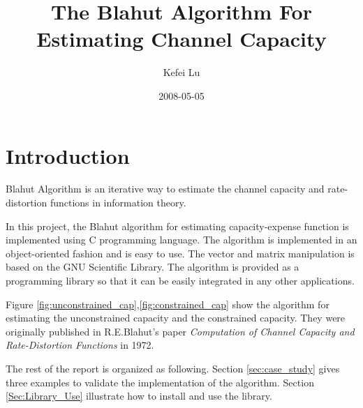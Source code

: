 \documentclass[a4paper,10pt]{article}
\author{Kefei Lu}
\title{The Blahut Algorithm For Estimating Channel Capacity}
\date{2008-05-05}
\begin{document}
\maketitle


\section{Introduction}
Blahut Algorithm is an iterative way to estimate the channel capacity and rate-distortion functions in information theory. 

In this project, the Blahut algorithm for estimating capacity-expense function is implemented using C programming language. The algorithm is implemented in an object-oriented fashion and is easy to use. The vector and matrix manipulation is based on the GNU Scientific Library. The algorithm is provided as a programming library so that it can be easily integrated in any other applications.

Figure \ref{fig:unconstrained_cap},\ref{fig:constrained_cap} show the algorithm for estimating the unconstrained capacity and the constrained capacity. They were originally published in R.E.Blahut's paper \textit{Computation of Channel Capacity and Rate-Distortion Functions} in 1972. 

The rest of the report is organized as following. Section \ref{sec:case_study} gives three examples to validate the implementation of the algorithm. Section \ref{Sec:Library_Use} illustrate how to install and use the library.
\end{document}
